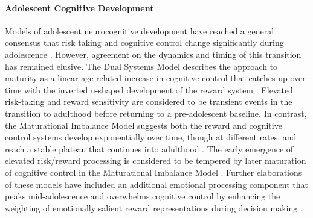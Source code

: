 \documentclass{article}%
\begin{document}
\paragraph*{Adolescent Cognitive Development} Models of adolescent neurocognitive development have reached a general consensus that risk taking and cognitive control change significantly during adolescence \citep{Steinberg2010}. However, agreement on the dynamics and timing of this transition has remained elusive. The Dual Systems Model describes the approach to maturity as a linear age-related increase in cognitive control that catches up over time with the inverted u-shaped development of the reward system \citep{Steinberg2005}. Elevated risk-taking and reward sensitivity are considered to be transient events in the transition to adulthood before returning to a pre-adolescent baseline. In contrast, the Maturational Imbalance Model suggests both the reward and cognitive control systems develop exponentially over time, though at different rates, and reach a stable plateau that continues into adulthood \citep{CaseyEtAl2008}. The early emergence of elevated risk/reward processing is considered to be tempered by later maturation of cognitive control in the Maturational Imbalance Model \citep{somerville2010developmental}. Further elaborations of these models have included an additional emotional processing component that peaks mid-adolescence and overwhelms cognitive control by enhancing the weighting of emotionally salient reward representations during decision making \citep{casey2019development}.
\vspace{4pt}
\end{document}
